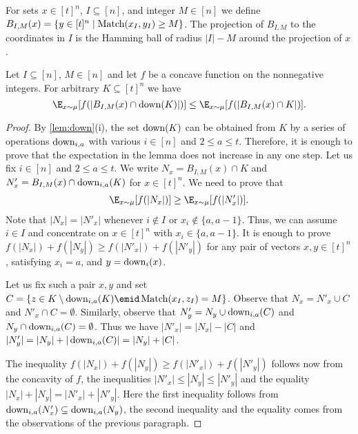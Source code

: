 For sets $x\in[t]^n$, $I\subseteq[n]$, and integer $M\in[n]$ we
define $B_{I,M}(x)=\{y\in[t]^n\mid\operatorname{Match}(x_I,y_I)\ge M\}$. The
projection of $B_{I,M}$ to the coordinates in $I$ is the Hamming
ball of radius $|I|-M$ around the projection of $x$.
\begin{lemma}
\label{lem:list}
Let $I\subseteq[n]$, $M\in[n]$ and let $f$ be a concave function
on the nonnegative integers. For arbitrary $K\subseteq [t]^n$ we
have
$$\E_{x\sim\mu}[f(|B_{I,M}(x)\cap\down(K)|)]\le
\E_{x\sim\mu}[f(|B_{I,M}(x)\cap K|)].$$
\end{lemma}

\begin{proof}
By \autoref{lem:down}(i), the set $\operatorname{down}(K)$ can be obtained
from $K$ by a series of operations $\operatorname{down}_{i,a}$ with various
$i\in[n]$ and $2\le a\le t$. Therefore, it is enough to prove
that the expectation in the lemma does not increase in any one
step. Let us fix $i\in[n]$ and $2\le a\le t$. We write
$N_x=B_{I,M}(x)\cap K$ and $N'_x=B_{I,M}(x)\cap\operatorname{down}_{i,a}(K)$
for $x\in[t]^n$. We need to prove that
\begin{align*}
\E_{x\sim\mu}[f(|N_x|)]\ge\E_{x\sim\mu}[f(|N'_x|)].
\end{align*} 
Note that $|N_x|=|N'_x|$ whenever $i\notin I$ or
$x_i\notin\{a,a-1\}$. Thus, we can assume $i\in I$ and
concentrate on $x\in[t]^n$ with $x_i\in\{a,a-1\}$. It is enough
to prove $f(|N_x|)+f(|N_y|)\ge f(|N'_x|)+f(|N'_y|)$ for any pair
of vectors $x,y\in[t]^n$, satisfying $x_i=a$, and
$y=\operatorname{down}_i(x)$.

Let us fix such a pair $x,y$ and set $C=\{z\in
K\setminus\down_{i,a}(K)\emid\Match(x_I,z_I)=M\}$. Observe that
$N_x = N'_x \cup C$ and $N'_x\cap C=\emptyset$. Similarly,
observe that $N'_y = N_y \cup \operatorname{down}_{i,a}(C)$ and $N_y \cap
\operatorname{down}_{i,a}(C)=\emptyset$. Thus we have $|N'_x|=|N_x|-|C|$ and
$|N'_y|=|N_y|+|\operatorname{down}_{i,a}(C)|=|N_y|+|C|$.

The inequality $f(|N_x|)+f(|N_y|)\ge f(|N'_x|)+f(|N'_y|)$
follows now from the concavity of $f$, the inequalities
$|N'_x|\le|N_y|\le|N'_y|$ and the equality
$|N_x|+|N_y|=|N'_x|+|N'_y|$. Here the first inequality follows
from $\operatorname{down}_{i,a}(N'_x)\subseteq\operatorname{down}_{i,a}(N_y)$, the second
inequality and the equality comes from the observations of the
previous paragraph.
\end{proof}

